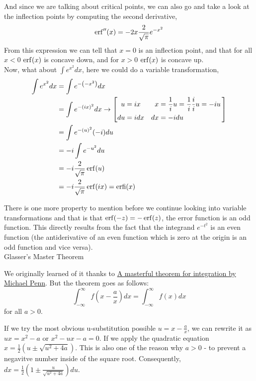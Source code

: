 And since we are talking about critical points, we can also go and take a look at the inflection points by computing the second
derivative,
$$
\operatorname{erf}^{\prime\prime}(x) = -2x \frac{2}{\sqrt{\pi}} e^{-x^2}
$$
From this expression we can tell that $x=0$ is an inflection point, and that for all $x<0$ $\operatorname{erf}(x)$ is concave down, and for $x>0$
$\operatorname{erf}(x)$ is concave up.
\\

Now, what about $\int e^{x^2} dx$, here we could do a variable transformation,
\begin{align*}
\int e^{x^2} dx &= \int e^{-\left(-x^2\right)} dx \\
& = \int e^{-(ix)^2} dx \rightarrow
\left[
    \begin{alignedat}{2}
        u  &= ix    \quad & x  &= \frac{1}{i}u = \frac{1}{i} \frac{i}{i} u = -iu \\
        du &= i dx  \quad & dx &= -i du
    \end{alignedat}\,
\right] \\
&= \int e^{-(u)^2} (-i) du \\
&= -i \int e^{-u^2} du \\
&= -i \frac{2}{\sqrt{\pi}} \operatorname{erf}(u) \\
&= -i \frac{2}{\sqrt{\pi}} \operatorname{erf}(ix) = \operatorname{erfi}(x)
\end{align*}

There is one more property to mention before we continue looking into variable transformations and that is that
$\operatorname{erf}(-z) = -\operatorname{erf}(z)$, the error function is an odd function.
This directly results from the fact that the integrand $e^{-t^2}$ is an even function
(the antiderivative of an even function which is zero at the origin is an odd function and vice versa).
\\

Glasser's Master Theorem

We originally learned of it thanks to
\href{https://www.youtube.com/watch?v=yilsH_GrscM}{A masterful theorem for integration by Michael Penn}.
But the theorem goes as follows:
$$
\int_{-\infty}^{\infty} f\left(x - \frac{a}{x}\right) dx = \int_{-\infty}^{\infty} f\left(x\right) dx
$$
for all $a>0$.

If we try the most obvious u-substitution possible $u = x - \frac{a}{x}$, we can rewrite it as $ux = x^2 - a$
or $x^2 - ux - a = 0$.
If we apply the quadratic equation $x = \frac{1}{2} \left(u \pm \sqrt{u^2 + 4a}\right)$.
This is also one of the reason why $a>0$ - to prevent a negavitve number inside of the square root.
Consequently, $dx = \frac{1}{2}\left( 1 \pm \frac{u}{\sqrt{u^2 + 4a}} \right) du$.

